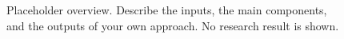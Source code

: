\begin{figure}[!t]
  \centering
  \caption{Placeholder overview. Describe the inputs, the main components,
  and the outputs of your own approach. No research result is shown.}
  \label{fig:overview}
\end{figure}
